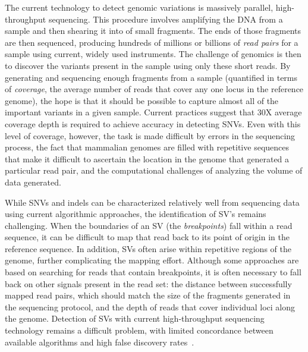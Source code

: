 \documentclass [11pt] {report}
\begin{document}
The current technology to detect genomic variations is massively parallel, high-throughput sequencing. This procedure involves amplifying the DNA from a sample and then shearing it into of small fragments. The ends of those fragments are then sequenced, producing hundreds of millions or billions of \emph{read pairs} for a sample using current, widely used instruments. The challenge of genomics is then to discover the variants present in the sample using only these short reads. By generating and sequencing enough fragments from a sample (quantified in terms of \emph{coverage}, the average number of reads that cover any one locus in the reference genome), the hope is that it should be possible to capture almost all of the important variants in a given sample. Current practices suggest that 30X average coverage depth is required to achieve accuracy in detecting SNVs. Even with this level of coverage, however, the task is made difficult by errors in the sequencing process, the fact that mammalian genomes are filled with repetitive sequences that make it difficult to ascertain the location in the genome that generated a particular read pair, and the computational challenges of analyzing the volume of data generated.

While SNVs and indels can be characterized relatively well from sequencing data using current algorithmic approaches, the identification of SV's remains challenging. When the boundaries of an SV (the \emph{breakpoints}) fall within a read sequence, it can be difficult to map that read back to its point of origin in the reference sequence. In addition, SVs often arise within repetitive regions of the genome, further complicating the mapping effort. Although some approaches are based on searching for reads that contain breakpoints, it is often necessary to fall back on other signals present in the read set: the distance between successfully mapped read pairs, which should match the size of the fragments generated in the sequencing protocol, and the depth of reads that cover individual loci along the genome. Detection of SVs with current high-throughput sequencing technology remains a difficult problem, with limited concordance between available algorithms and high false discovery rates~\cite{Mills:2011p1611}.
\end{document}
